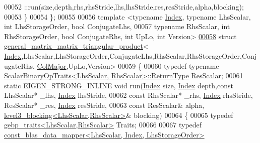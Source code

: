 \begin{DoxyCode}
00052       ::run(size,depth,rhs,rhsStride,lhs,lhsStride,res,resStride,alpha,blocking);
00053   \}
00054 \};
00055 
00056 \textcolor{keyword}{template} <\textcolor{keyword}{typename} \hyperlink{namespace_eigen_a62e77e0933482dafde8fe197d9a2cfde}{Index}, \textcolor{keyword}{typename} LhsScalar, \textcolor{keywordtype}{int} LhsStorageOrder, \textcolor{keywordtype}{bool} ConjugateLhs,
00057                           \textcolor{keyword}{typename} RhsScalar, \textcolor{keywordtype}{int} RhsStorageOrder, \textcolor{keywordtype}{bool} ConjugateRhs, \textcolor{keywordtype}{int}  UpLo, \textcolor{keywordtype}{int} 
      Version>
\hyperlink{struct_eigen_1_1internal_1_1general__matrix__matrix__triangular__product_3_01_index_00_01_lhs_sc850fa7ad178159e52280c5aa1e0ab36e}{00058} \textcolor{keyword}{struct }\hyperlink{struct_eigen_1_1internal_1_1general__matrix__matrix__triangular__product}{general\_matrix\_matrix\_triangular\_product}<
      \hyperlink{namespace_eigen_a62e77e0933482dafde8fe197d9a2cfde}{Index},LhsScalar,LhsStorageOrder,ConjugateLhs,RhsScalar,RhsStorageOrder,ConjugateRhs,
      \hyperlink{group__enums_ggaacded1a18ae58b0f554751f6cdf9eb13a0cbd4bdd0abcfc0224c5fcb5e4f6669a}{ColMajor},UpLo,Version>
00059 \{
00060   \textcolor{keyword}{typedef} \textcolor{keyword}{typename} \hyperlink{group___core___module_struct_eigen_1_1_scalar_binary_op_traits}{ScalarBinaryOpTraits<LhsScalar, RhsScalar>::ReturnType}
       ResScalar;
00061   \textcolor{keyword}{static} EIGEN\_STRONG\_INLINE \textcolor{keywordtype}{void} run(\hyperlink{namespace_eigen_a62e77e0933482dafde8fe197d9a2cfde}{Index} size, \hyperlink{namespace_eigen_a62e77e0933482dafde8fe197d9a2cfde}{Index} depth,\textcolor{keyword}{const} LhsScalar* \_lhs, 
      \hyperlink{namespace_eigen_a62e77e0933482dafde8fe197d9a2cfde}{Index} lhsStride,
00062                                       \textcolor{keyword}{const} RhsScalar* \_rhs, \hyperlink{namespace_eigen_a62e77e0933482dafde8fe197d9a2cfde}{Index} rhsStride, ResScalar* \_res, 
      \hyperlink{namespace_eigen_a62e77e0933482dafde8fe197d9a2cfde}{Index} resStride,
00063                                       \textcolor{keyword}{const} ResScalar& alpha, 
      \hyperlink{class_eigen_1_1internal_1_1level3__blocking}{level3\_blocking<LhsScalar,RhsScalar>}& blocking)
00064   \{
00065     \textcolor{keyword}{typedef} \hyperlink{class_eigen_1_1internal_1_1gebp__traits}{gebp\_traits<LhsScalar,RhsScalar>} Traits;
00066 
00067     \textcolor{keyword}{typedef} \hyperlink{class_eigen_1_1internal_1_1const__blas__data__mapper}{const\_blas\_data\_mapper<LhsScalar, Index, LhsStorageOrder>}

\end{DoxyCode}
